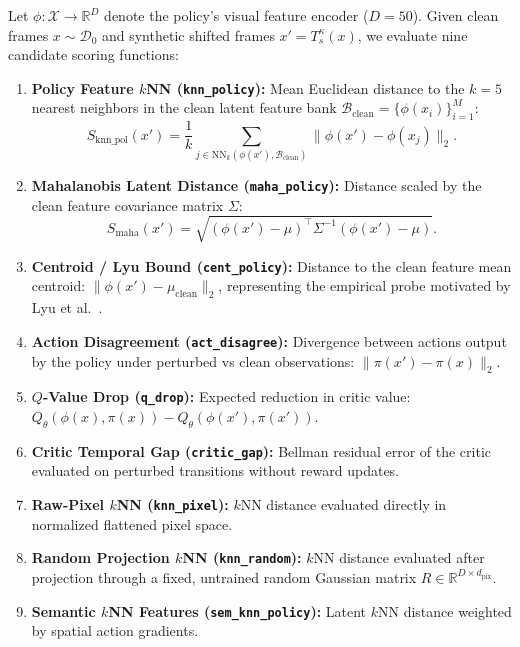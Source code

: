 Let $\phi: \mathcal{X} \to \mathbb{R}^D$ denote the policy's visual feature encoder ($D = 50$). Given clean frames $x \sim \mathcal{D}_0$ and synthetic shifted frames $x' = T_s^\kappa(x)$, we evaluate nine candidate scoring functions:
\begin{enumerate}
    \item \textbf{Policy Feature $k$NN (\texttt{knn\_policy}):} Mean Euclidean distance to the $k = 5$ nearest neighbors in the clean latent feature bank $\mathcal{B}_{\mathrm{clean}} = \{\phi(x_i)\}_{i=1}^M$:
    \begin{equation}
        S_{\mathrm{knn\_pol}}(x') = \frac{1}{k} \sum_{j \in \mathrm{NN}_k(\phi(x'), \mathcal{B}_{\mathrm{clean}})} \|\phi(x') - \phi(x_j)\|_2.
    \end{equation}
    \item \textbf{Mahalanobis Latent Distance (\texttt{maha\_policy}):} Distance scaled by the clean feature covariance matrix $\Sigma$:
    \begin{equation}
        S_{\mathrm{maha}}(x') = \sqrt{(\phi(x') - \mu)^\top \Sigma^{-1} (\phi(x') - \mu)}.
    \end{equation}
    \item \textbf{Centroid / Lyu Bound (\texttt{cent\_policy}):} Distance to the clean feature mean centroid: $\|\phi(x') - \mu_{\mathrm{clean}}\|_2$, representing the empirical probe motivated by Lyu et al.~\citep{lyu2024generalization}.
    \item \textbf{Action Disagreement (\texttt{act\_disagree}):} Divergence between actions output by the policy under perturbed vs clean observations: $\|\pi(x') - \pi(x)\|_2$.
    \item \textbf{$Q$-Value Drop (\texttt{q\_drop}):} Expected reduction in critic value: $Q_\theta(\phi(x), \pi(x)) - Q_\theta(\phi(x'), \pi(x'))$.
    \item \textbf{Critic Temporal Gap (\texttt{critic\_gap}):} Bellman residual error of the critic evaluated on perturbed transitions without reward updates.
    \item \textbf{Raw-Pixel $k$NN (\texttt{knn\_pixel}):} $k$NN distance evaluated directly in normalized flattened pixel space.
    \item \textbf{Random Projection $k$NN (\texttt{knn\_random}):} $k$NN distance evaluated after projection through a fixed, untrained random Gaussian matrix $R \in \mathbb{R}^{D \times d_{\mathrm{pix}}}$.
    \item \textbf{Semantic $k$NN Features (\texttt{sem\_knn\_policy}):} Latent $k$NN distance weighted by spatial action gradients.
\end{enumerate}


